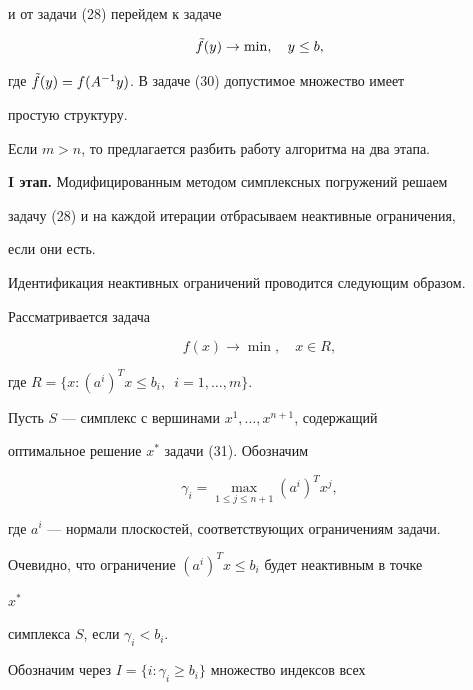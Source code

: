 и от задачи (28) перейдем к задаче


\begin{equation}


\Tilde f(y)\to\min,\quad y\le b,


\end{equation}


где $\Tilde f(y)=f(A^{-1}y)$. В задаче (30) допустимое множество имеет


простую структуру.





Если $m>n$, то предлагается разбить работу алгоритма на два этапа.





{\bf I этап.} Модифицированным методом симплексных погружений решаем


задачу (28) и на каждой итерации отбрасываем неактивные ограничения,


если они есть.





Идентификация неактивных ограничений проводится следующим образом.


Рассматривается задача


\begin{equation}


f(x)\to\min,\quad x\in R,


\end{equation}


где $R=\{x:(a^i)^Tx\le b_i,\ \;i=1,\dotsc,m\}$.


Пусть $S$ --- симплекс с вершинами $x^1,\dotsc,x^{n+1}$, содержащий


оптимальное решение $x^*$ задачи (31). Обозначим


$$


\gamma_i=\max_{1\le j\le n+1}(a^i)^Tx^j,


$$


где $a^i$ --- нормали плоскостей, соответствующих ограничениям задачи.


Очевидно, что ограничение $(a^i)^Tx\le b_i$ будет неактивным в точке


$x^*$


симплекса $S$, если $\gamma_i<b_i$.





Обозначим через $I=\{i:\gamma_i\ge b_i\}$ множество индексов всех


